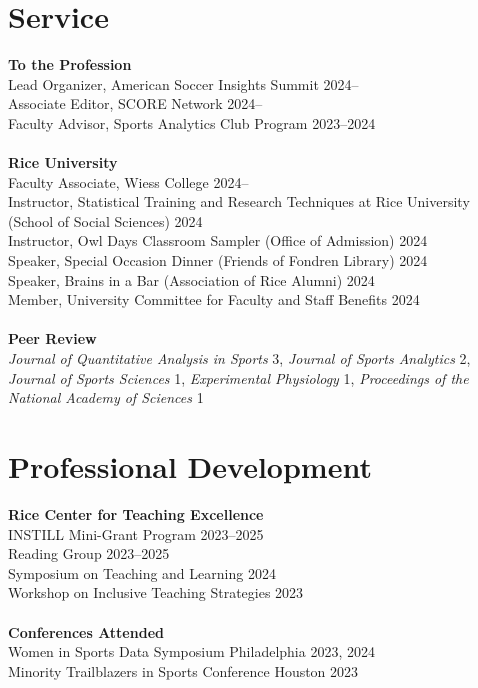 \documentclass{article}
\begin{document}
\section*{\sc Service}

{\bf To the Profession}\\
Lead Organizer, American Soccer Insights Summit \hfill 2024--\\
Associate Editor, SCORE Network \hfill 2024--\\
Faculty Advisor, Sports Analytics Club Program \hfill 2023--2024\\
~\\
{\bf Rice University}\\
Faculty Associate, Wiess College \hfill 2024--\\
Instructor, Statistical Training and Research Techniques at Rice University \hfill (School of Social Sciences) \hfill 2024\\
Instructor, Owl Days Classroom Sampler (Office of Admission) \hfill 2024\\
Speaker, Special Occasion Dinner (Friends of Fondren Library) \hfill 2024\\
Speaker, Brains in a Bar (Association of Rice Alumni) \hfill 2024\\
Member, University Committee for Faculty and Staff Benefits \hfill 2024\\
~\\
{\bf Peer Review}\\
{\it Journal of Quantitative Analysis in Sports} 3, {\it Journal of Sports Analytics} 2, {\it Journal of Sports Sciences} 1, {\it Experimental Physiology} 1, {\it Proceedings of the National Academy of Sciences} 1

\section*{\sc Professional Development}

{\bf Rice Center for Teaching Excellence}\\
INSTILL Mini-Grant Program \hfill 2023--2025\\
Reading Group \hfill 2023--2025\\
Symposium on Teaching and Learning \hfill 2024\\
Workshop on Inclusive Teaching Strategies \hfill 2023\\
~\\
{\bf Conferences Attended}\\
Women in Sports Data Symposium \hfill Philadelphia 2023, 2024\\
Minority Trailblazers in Sports Conference \hfill Houston 2023
\end{document}
